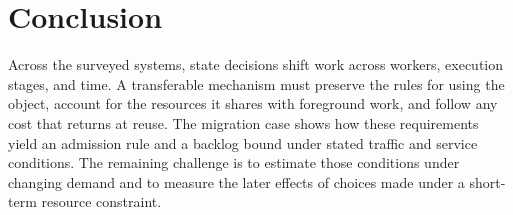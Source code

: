 \documentclass[manuscript]{acmart}
\begin{document}
\section{Conclusion}
\label{sec:conclusion}

Across the surveyed systems, state decisions shift work across workers, execution stages, and time. A transferable mechanism must preserve the rules for using the object, account for the resources it shares with foreground work, and follow any cost that returns at reuse. The migration case shows how these requirements yield an admission rule and a backlog bound under stated traffic and service conditions. The remaining challenge is to estimate those conditions under changing demand and to measure the later effects of choices made under a short-term resource constraint.

\clearpage



\end{document}
